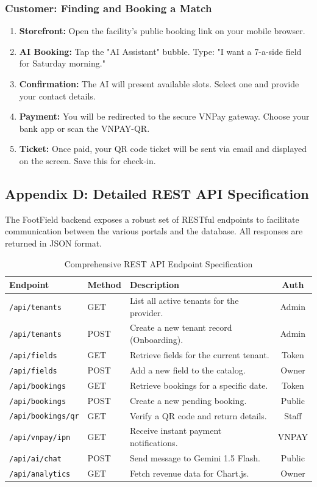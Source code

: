 \subsubsection{Customer: Finding and Booking a Match}
\begin{enumerate}
    \item \textbf{Storefront:} Open the facility's public booking link on your mobile browser.
    \item \textbf{AI Booking:} Tap the "AI Assistant" bubble. Type: "I want a 7-a-side field for Saturday morning."
    \item \textbf{Confirmation:} The AI will present available slots. Select one and provide your contact details.
    \item \textbf{Payment:} You will be redirected to the secure VNPay gateway. Choose your bank app or scan the VNPAY-QR.
    \item \textbf{Ticket:} Once paid, your QR code ticket will be sent via email and displayed on the screen. Save this for check-in.
\end{enumerate}

\subsection*{Appendix D: Detailed REST API Specification}
The FootField backend exposes a robust set of RESTful endpoints to facilitate communication between the various portals and the database. All responses are returned in JSON format.

\begin{table}[htbp]
\centering
\begin{tabularx}{\textwidth}{|l|l|X|c|}
\hline
\rowcolor{LightCyan}
\textbf{Endpoint} & \textbf{Method} & \textbf{Description} & \textbf{Auth} \\ \hline
\texttt{/api/tenants} & GET & List all active tenants for the provider. & Admin \\ \hline
\texttt{/api/tenants} & POST & Create a new tenant record (Onboarding). & Admin \\ \hline
\texttt{/api/fields} & GET & Retrieve fields for the current tenant. & Token \\ \hline
\texttt{/api/fields} & POST & Add a new field to the catalog. & Owner \\ \hline
\texttt{/api/bookings} & GET & Retrieve bookings for a specific date. & Token \\ \hline
\texttt{/api/bookings} & POST & Create a new pending booking. & Public \\ \hline
\texttt{/api/bookings/qr} & GET & Verify a QR code and return details. & Staff \\ \hline
\texttt{/api/vnpay/ipn} & GET & Receive instant payment notifications. & VNPAY \\ \hline
\texttt{/api/ai/chat} & POST & Send message to Gemini 1.5 Flash. & Public \\ \hline
\texttt{/api/analytics} & GET & Fetch revenue data for Chart.js. & Owner \\ \hline
\end{tabularx}
\caption{Comprehensive REST API Endpoint Specification}
\end{table}

